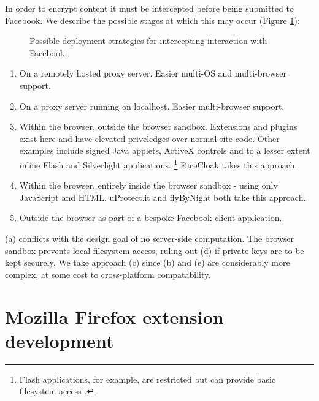 In order to encrypt content it must be intercepted before being submitted to Facebook. We describe the possible stages at which this may occur (Figure \ref{fig:approaches}):

\begin{figure}[tb]
\begin{center}
    
\caption{Possible deployment strategies for intercepting interaction with Facebook.}
\label{fig:approaches}
\end{center}
\end{figure}


\begin{enumerate}
\renewcommand{\labelenumi}{\alph{enumi})}
    
    \item On a remotely hosted proxy server. Easier multi-OS and multi-browser support.
    
    \item On a proxy server running on localhost. Easier multi-browser support.
    
    \item Within the browser, outside the browser sandbox. Extensions and plugins exist here and have elevated priveledges over normal site code. Other examples include signed Java applets, ActiveX controls and to a lesser extent inline Flash and Silverlight applications. \footnote{Flash applications, for example, are restricted but can provide basic filesystem access \cite{flash-sbox}.} FaceCloak takes this approach.
    
    \item Within the browser, entirely inside the browser sandbox - using only JavaScript and HTML. uProtect.it and flyByNight both take this approach.
    
    \item Outside the browser as part of a bespoke Facebook client application.
    
\end{enumerate}
   
(a) conflicts with the design goal of no server-side computation. The browser sandbox prevents local filesystem access, ruling out (d) if private keys are to be kept securely. We take approach (c) since (b) and (e) are considerably more complex, at some cost to cross-platform compatability.



\FloatBarrier
\section{Mozilla Firefox extension development}

